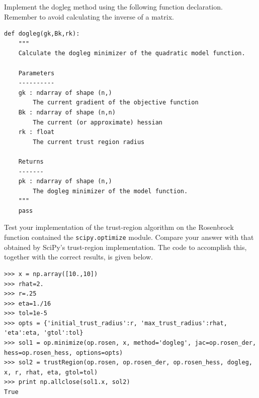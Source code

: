\begin{problem}
Implement the dogleg method using the following function declaration.
Remember to avoid calculating the inverse of a matrix.
\begin{lstlisting}
def dogleg(gk,Bk,rk):
    """
    Calculate the dogleg minimizer of the quadratic model function.
    
    Parameters
    ----------
    gk : ndarray of shape (n,)
        The current gradient of the objective function
    Bk : ndarray of shape (n,n)
        The current (or approximate) hessian
    rk : float
        The current trust region radius
        
    Returns
    -------
    pk : ndarray of shape (n,)
        The dogleg minimizer of the model function.
    """
    pass 
\end{lstlisting}


\end{problem}

Test your implementation of the trust-region algorithm on the Rosenbrock function contained the {\tt scipy.optimize} module.
Compare your answer with that obtained by SciPy's trust-region implementation. The code to accomplish this, together with the 
correct results, is given below.
\begin{lstlisting}
>>> x = np.array([10.,10])
>>> rhat=2.
>>> r=.25
>>> eta=1./16
>>> tol=1e-5
>>> opts = {'initial_trust_radius':r, 'max_trust_radius':rhat, 'eta':eta, 'gtol':tol}
>>> sol1 = op.minimize(op.rosen, x, method='dogleg', jac=op.rosen_der, hess=op.rosen_hess, options=opts)
>>> sol2 = trustRegion(op.rosen, op.rosen_der, op.rosen_hess, dogleg, x, r, rhat, eta, gtol=tol)
>>> print np.allclose(sol1.x, sol2)
True
\end{lstlisting}
